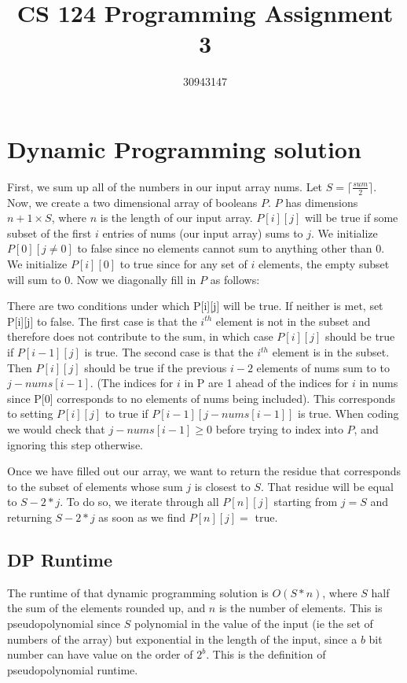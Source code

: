 \documentclass{article}
\begin{document}
\title{CS 124 Programming Assignment 3}
\author{30943147}
\maketitle

\section*{Dynamic Programming solution}
First, we sum up all of the numbers in our input array nums. Let $S = \lceil \frac{sum}{2} \rceil$. Now, we create a two dimensional array of booleans $P$. $P$ has dimensions $n+1 \times S$, where $n$ is the length of our input array. $P[i][j]$ will be true if some subset of the first $i$ entries of nums (our input array) sums to $j$. We initialize $P[0][j \neq 0]$ to false since no elements cannot sum to anything other than 0. We initialize $P[i][0]$ to true since for any set of $i$ elements, the empty subset will sum to 0. Now we diagonally fill in $P$ as follows:

There are two conditions under which P[i][j] will be true. If neither is met, set P[i][j] to false. The first case is that the $i^{th}$ element is not in the subset and therefore does not contribute to the sum, in which case $P[i][j]$ should be true if $P[i-1][j]$ is true. The second case is that the $i^{th}$ element is in the subset. Then $P[i][j]$ should be true if the previous $i-2$ elements of nums sum to to $j-nums[i-1]$. (The indices for $i$ in P are 1 ahead of the indices for $i$ in nums since P[0] corresponds to no elements of nums being included). This corresponds to setting $P[i][j]$ to true if $P[i-1][j-nums[i-1]]$ is true. When coding we would check that $j-nums[i-1] \geq 0$ before trying to index into $P$, and ignoring this step otherwise. 

Once we have filled out our array, we want to return the residue that corresponds to the subset of elements whose sum $j$ is closest to $S$. That residue will be equal to $S-2*j$. To do so, we iterate through all $P[n][j]$ starting from $j=S$ and returning $S-2*j$ as soon as we find $P[n][j] = $ true.

\subsection*{DP Runtime}
The runtime of that dynamic programming solution is $O(S * n)$, where $S$ half the sum of the elements rounded up, and $n$ is the number of elements. This is pseudopolynomial since $S$ polynomial in the value of the input (ie the set of numbers of the array) but exponential in the length of the input, since a $b$ bit number can have value on the order of $2^b$. This is the definition of pseudopolynomial runtime. 
\end{document}
